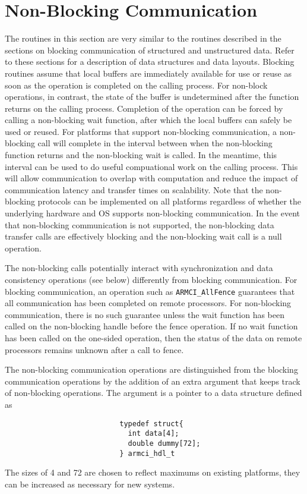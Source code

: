 \documentclass[12pt]{article}
\begin{document}
\section{Non-Blocking Communication}
The routines in this section are very similar to the routines described in the
sections on blocking communication of structured and unstructured data. Refer to
these sections for a description of data structures and data layouts. Blocking
routines assume that local buffers are immediately available for use or reuse as
soon as the operation is completed on the calling process. For non-block operations,
in contrast, the state of the buffer is undetermined after the function returns
on the calling process. Completion of the operation can be forced by calling a
non-blocking wait function, after which the local buffers can safely be used or
reused. For platforms that support non-blocking communication, a non-blocking
call will complete in the interval between when the non-blocking function returns
and the non-blocking wait is called. In the meantime, this interval can be used to
do useful compuational work on the calling process. This will allow communication
to overlap with computation and reduce the impact of communication latency and
transfer times on scalability. Note that the non-blocking protocols can be
implemented on all platforms regardless of whether the underlying hardware and
OS supports non-blocking communication. In the event that non-blocking
communication is not supported, the non-blocking data transfer calls are
effectively blocking and the non-blocking wait call is a null operation.

The non-blocking calls potentially interact with synchronization and data
consistency operations (see below) differently from blocking communication. For
blocking communication, an operation such as \texttt{ARMCI\_AllFence} guarantees that all
communication has been completed on remote processors. For non-blocking
communication, there is no such guarantee unless the wait function has been
called on the non-blocking handle before the fence operation. If no wait
function has been called on the one-sided operation, then the status of the data
on remote processors remains unknown after a call to fence.

The non-blocking communication operations are distinguished from the blocking
communication operations by the addition of an extra argument that keeps track
of non-blocking operations. The argument is a pointer to a data structure
defined as
\begin{verbatim}
                           typedef struct{
                             int data[4];
                             double dummy[72];
                           } armci_hdl_t
\end{verbatim}
The sizes of 4 and 72 are chosen to reflect maximums on existing platforms, they
can be increased as necessary for new systems.
\end{document}
